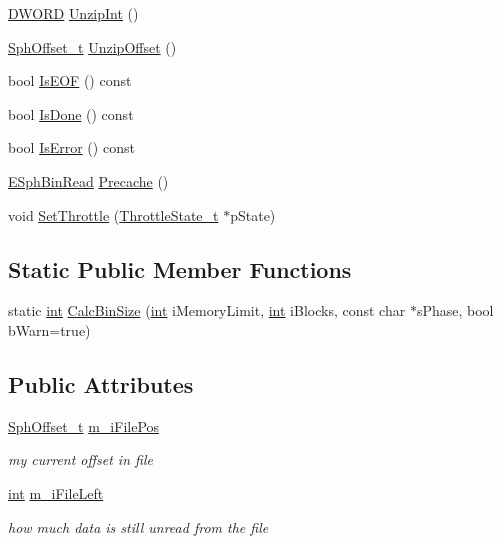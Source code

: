 \begin{DoxyCompactItemize}
\item 
\hyperlink{sphinxstd_8h_a798af1e30bc65f319c1a246cecf59e39}{D\-W\-O\-R\-D} \hyperlink{structCSphBin_a929258783306bf28fb654b918edd42b0}{Unzip\-Int} ()
\item 
\hyperlink{sphinx_8h_a0fb3b64afebef33c61367714754eaa90}{Sph\-Offset\-\_\-t} \hyperlink{structCSphBin_ad2fe4990afa264b29a5c10e964e8612e}{Unzip\-Offset} ()
\item 
bool \hyperlink{structCSphBin_ae1a5af7c469e49d9bef69bbc7b7016f3}{Is\-E\-O\-F} () const 
\item 
bool \hyperlink{structCSphBin_afc65d17a53403e591001b92ee3fe11cf}{Is\-Done} () const 
\item 
bool \hyperlink{structCSphBin_a5ad7a8354b8522ca42dbad3375a0eb4f}{Is\-Error} () const 
\item 
\hyperlink{sphinx_8cpp_ac9b00943d3f5ca56056fdc4c7cb8f58c}{E\-Sph\-Bin\-Read} \hyperlink{structCSphBin_a884ee51d51808e5e04cddfd8bcb23244}{Precache} ()
\item 
void \hyperlink{structCSphBin_a85fa51786a734bd68dc05982fafb5bda}{Set\-Throttle} (\hyperlink{structThrottleState__t}{Throttle\-State\-\_\-t} $\ast$p\-State)
\end{DoxyCompactItemize}
\subsection*{Static Public Member Functions}
\begin{DoxyCompactItemize}
\item 
static \hyperlink{sphinxexpr_8cpp_a4a26e8f9cb8b736e0c4cbf4d16de985e}{int} \hyperlink{structCSphBin_ac16842058b2b905551ef1bf5b9a3e89e}{Calc\-Bin\-Size} (\hyperlink{sphinxexpr_8cpp_a4a26e8f9cb8b736e0c4cbf4d16de985e}{int} i\-Memory\-Limit, \hyperlink{sphinxexpr_8cpp_a4a26e8f9cb8b736e0c4cbf4d16de985e}{int} i\-Blocks, const char $\ast$s\-Phase, bool b\-Warn=true)
\end{DoxyCompactItemize}
\subsection*{Public Attributes}
\begin{DoxyCompactItemize}
\item 
\hyperlink{sphinx_8h_a0fb3b64afebef33c61367714754eaa90}{Sph\-Offset\-\_\-t} \hyperlink{structCSphBin_a585e1b9422f4de962b993a4991f560eb}{m\-\_\-i\-File\-Pos}
\begin{DoxyCompactList}\small\item\em my current offset in file \end{DoxyCompactList}\item 
\hyperlink{sphinxexpr_8cpp_a4a26e8f9cb8b736e0c4cbf4d16de985e}{int} \hyperlink{structCSphBin_abc84b9fa20cbb58c6b96999903da4576}{m\-\_\-i\-File\-Left}
\begin{DoxyCompactList}\small\item\em how much data is still unread from the file \end{DoxyCompactList}\end{DoxyCompactItemize}
